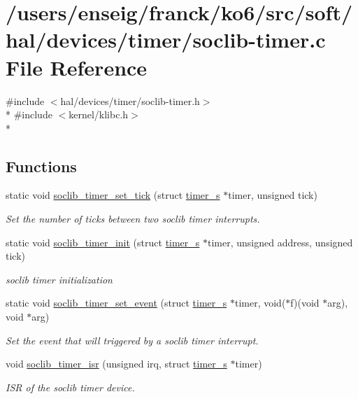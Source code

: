 \hypertarget{soclib-timer_8c}{\section{/users/enseig/franck/ko6/src/soft/hal/devices/timer/soclib-\/timer.c File Reference}
\label{soclib-timer_8c}
}
{\ttfamily \#include $<$hal/devices/timer/soclib-\/timer.\-h$>$}\\*
{\ttfamily \#include $<$kernel/klibc.\-h$>$}\\*
\subsection*{Functions}
\begin{DoxyCompactItemize}
\item 
static void \hyperlink{soclib-timer_8c_ac2c8f389a9bd0b9ea95d53a94678a673}{soclib\-\_\-timer\-\_\-set\-\_\-tick} (struct \hyperlink{structtimer__s}{timer\-\_\-s} $\ast$timer, unsigned tick)
\begin{DoxyCompactList}\small\item\em Set the number of ticks between two soclib timer interrupts. \end{DoxyCompactList}\item 
static void \hyperlink{soclib-timer_8c_a1405d0312746c5a3b462b789940cdfcf}{soclib\-\_\-timer\-\_\-init} (struct \hyperlink{structtimer__s}{timer\-\_\-s} $\ast$timer, unsigned address, unsigned tick)
\begin{DoxyCompactList}\small\item\em soclib timer initialization \end{DoxyCompactList}\item 
static void \hyperlink{soclib-timer_8c_a7559ec7d6e01dd48142d752e543fc689}{soclib\-\_\-timer\-\_\-set\-\_\-event} (struct \hyperlink{structtimer__s}{timer\-\_\-s} $\ast$timer, void($\ast$f)(void $\ast$arg), void $\ast$arg)
\begin{DoxyCompactList}\small\item\em Set the event that will triggered by a soclib timer interrupt. \end{DoxyCompactList}\item 
void \hyperlink{soclib-timer_8c_ad4d0316e8dbbe5427118ba5a8a03f12d}{soclib\-\_\-timer\-\_\-isr} (unsigned irq, struct \hyperlink{structtimer__s}{timer\-\_\-s} $\ast$timer)
\begin{DoxyCompactList}\small\item\em I\-S\-R of the soclib timer device. \end{DoxyCompactList}\end{DoxyCompactItemize}
